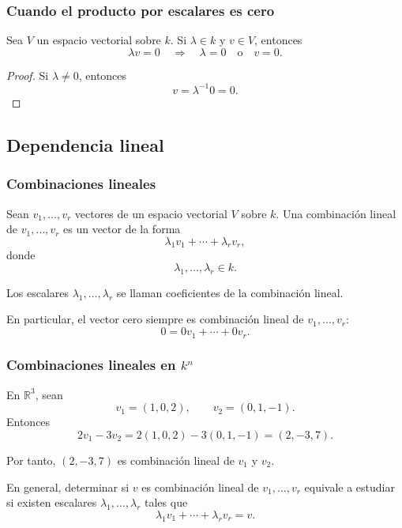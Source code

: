 \begin{frame}
    \frametitle{Cuando el producto por escalares es cero}

    \begin{corollary}
        Sea \(V\) un espacio vectorial sobre \(k\). Si \(\lambda\in k\) y \(v\in V\),
        entonces
        \[
            \lambda v=0
            \quad\Longrightarrow\quad
            \lambda=0
            \quad\text{o}\quad
            v=0.
        \]
    \end{corollary}

    \begin{proof}
        Si \(\lambda\neq 0\), entonces 
        \[v=\lambda^{-1}0=0.\]
    \end{proof}
\end{frame}


\subsection{Dependencia lineal}

\begin{frame}
    \frametitle{Combinaciones lineales}

    \begin{definition}
        Sean \(v_1,\ldots,v_r\) vectores de un espacio vectorial \(V\) sobre \(k\).
        Una \alert{combinación lineal} de \(v_1,\ldots,v_r\) es un vector de la forma
        \[
            \lambda_1v_1+\cdots+\lambda_rv_r,
        \]
        donde
        \[
            \lambda_1,\ldots,\lambda_r\in k.
        \]

        Los escalares \(\lambda_1,\ldots,\lambda_r\) se llaman
        \alert{coeficientes} de la combinación lineal.
    \end{definition}

    En particular, el vector cero siempre es combinación lineal de
    \(v_1,\ldots,v_r\):
    \[
        0=0v_1+\cdots+0v_r.
    \]
\end{frame}


\begin{frame}
    \frametitle{Combinaciones lineales en \(k^n\)}

    \begin{example}
        En \(\mathbb{R}^3\), sean
        \[
            v_1=(1,0,2),
            \qquad
            v_2=(0,1,-1).
        \]
        Entonces
        \[
            2v_1-3v_2
            =
            2(1,0,2)-3(0,1,-1)
            =
            (2,-3,7).
        \]

        Por tanto, \((2,-3,7)\) es combinación lineal de \(v_1\) y \(v_2\).
    \end{example}

    \medskip

    En general, determinar si \(v\) es combinación lineal de
    \(v_1,\ldots,v_r\) equivale a estudiar si existen escalares
    \(\lambda_1,\ldots,\lambda_r\) tales que
    \[
        \lambda_1v_1+\cdots+\lambda_rv_r=v.
    \]
\end{frame}


